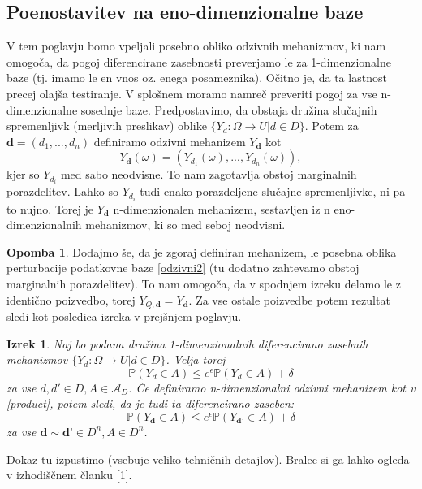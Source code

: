 \documentclass[12pt,a4paper]{amsart}
\theoremstyle{definition} %
\newtheorem{opomba}[definicija]{Opomba}
\theoremstyle{plain} %
\newtheorem{izrek}[definicija]{Izrek}
\begin{document}
\subsection{Poenostavitev na eno-dimenzionalne baze}
V tem poglavju bomo vpeljali posebno obliko odzivnih mehanizmov, ki nam omogoča, da pogoj diferencirane zasebnosti preverjamo le za 1-dimenzionalne baze (tj. imamo le en vnos oz. enega posameznika). Očitno je, da ta lastnost precej olajša testiranje. V splošnem moramo namreč preveriti pogoj za vse n-dimenzionalne sosednje baze.
\newline
\newline
Predpostavimo, da obstaja družina slučajnih spremenljivk (merljivih preslikav) oblike $\{ Y_d: \Omega \rightarrow U | d \in D\}$.  Potem za $\textbf{d} = (d_1,...,d_n)$ definiramo odzivni mehanizem $Y_{\textbf{d}}$ kot  
\begin{equation}\label{product}
Y_{\textbf{d}} (\omega) = (Y_{d_1} (\omega) , ... , Y_{d_n} (\omega)), \tag{5}
\end{equation}
kjer so $Y_{d_i}$ med sabo neodvisne. To nam zagotavlja obstoj marginalnih porazdelitev.  Lahko so $Y_{d_i}$ tudi enako porazdeljene slučajne spremenljivke, ni pa to nujno. Torej je $Y_{\textbf{d}}$ n-dimenzionalen mehanizem, sestavljen iz n eno-dimenzionalnih mehanizmov, ki so med seboj neodvisni. 
\newline
\newline
\begin{opomba} Dodajmo še, da je zgoraj definiran mehanizem, le posebna oblika perturbacije podatkovne baze \eqref{odzivni2} (tu dodatno zahtevamo obstoj marginalnih porazdelitev). To nam omogoča, da v spodnjem izreku delamo le z identično poizvedbo, torej $Y_{Q, \textbf{d}}=Y_{\textbf{d}}$. Za vse ostale poizvedbe potem rezultat sledi kot posledica izreka v prejšnjem poglavju. 
\end{opomba}
\begin{izrek} Naj bo podana družina 1-dimenzionalnih diferencirano zasebnih mehanizmov $\{ Y_d: \Omega \rightarrow U | d \in D\}$. Velja torej
$$\mathbb{P}(Y_d \in A) \leq e^\epsilon \mathbb{P}(Y_d \in A) + \delta$$ 
za vse $d,d' \in D, A \in \mathcal{A}_D$. Če definiramo n-dimenzionalni odzivni mehanizem kot v \eqref{product}, potem sledi, da je tudi ta diferencirano zaseben:
$$\mathbb{P}(Y_{\textbf{d}} \in A) \leq e^\epsilon \mathbb{P}(Y_{\textbf{d'}} \in A) + \delta$$
za vse $\textbf{d} \sim \textbf{d'} \in D^n, A \in D^n$.
\end{izrek}
Dokaz tu izpustimo (vsebuje veliko tehničnih detajlov). Bralec si ga lahko ogleda v izhodiščnem članku [1].
\end{document}
